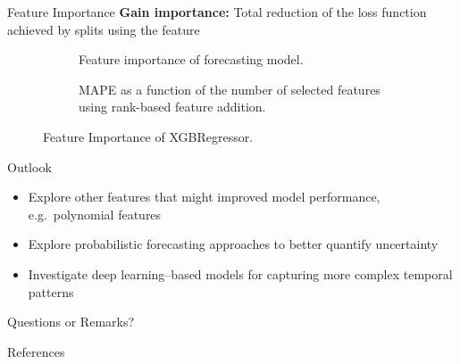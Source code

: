 \documentclass[10pt, aspectratio=169]{beamer}
\begin{document}
\begin{frame}{Feature Importance}
    \textbf{Gain importance:} Total reduction of the loss function achieved by splits using the feature
    \begin{figure}
        \centering
        \begin{subfigure}{0.49\linewidth}
            
            \caption{\vspace{1.4em}Feature importance of forecasting model.}
            \label{fig:feature_importance}
        \end{subfigure}
        \begin{subfigure}{0.49\linewidth}
            \centering
            
            \caption{MAPE as a function of the number of selected features using rank-based feature addition.}
            \label{fig:feature_importance_gain}
        \end{subfigure}
        \vspace{-1em}
        \caption{Feature Importance of XGBRegressor.}
    \end{figure}
\end{frame}

\begin{frame}{Outlook}
    \begin{itemize}
        \item Explore other features that might improved model performance, e.g.\ polynomial features
        \item Explore probabilistic forecasting approaches to better quantify uncertainty
        \item Investigate deep learning–based models for capturing more complex temporal patterns
    \end{itemize}
\end{frame}

\appendix
{}

{
\begin{frame}[standout]
  Questions or Remarks?
\end{frame}}

\begin{frame}[allowframebreaks]{References}
  \printbibliography[heading=none]
\end{frame}
\end{document}
